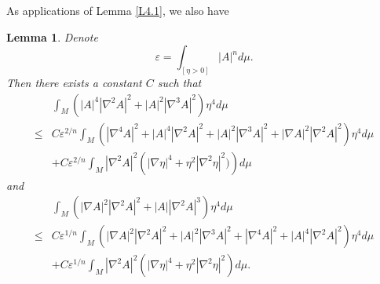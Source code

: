 \documentclass{amsart}
\newtheorem{lemma}[theorem]{Lemma}
\theoremstyle{definition}
\numberwithin{equation}{section}
\begin{document}
As applications of Lemma \ref{L4.1}, we also have
\begin{lemma} \label{L4.4}
Denote
$$\varepsilon = \int_{[\eta >0] } \left| A \right|^{n} d\mu.$$
Then there exists a constant $C$ such that
\begin{align}\label{E1}
   &\int_{M}(  |A|^4 |\nabla^2 A|^2+|A|^2|\nabla^3A|^2  )\eta^4 d\mu\\
    \leq & C \varepsilon^{2/n}\int_{M}  \left (|\nabla^{4}  A|^2+ |A|^4 |\nabla^2 A|^2+ |A|^2|\nabla^3A|^2+ |\nabla A|^2 |\nabla^2
    A|^2\right  )\eta^4d\mu \nonumber\\
     &+  C \varepsilon^{2/n}\int_{M} |\nabla^2 A|^{2}   \left (|\nabla \eta|^4+\eta^2 |\nabla^2\eta|^2 )\right )  d\mu \nonumber
\end{align}
and
\begin{align}\label{2E1}
   &\int_{M}(  |\nabla A|^2 |\nabla^2 A|^2+|A| |\nabla^2A|^3)\eta^4 d\mu\\
    \leq &  C\varepsilon^{1/n}\int_{M} ( |\nabla  A|^2  |\nabla^{2} A |^2+|A|^2|\nabla^{3} A |^2+ |\nabla^4 A|^2+ |A|^4|\nabla^2 A|^2)  \eta^4
    d\mu\nonumber\\
       &+   C\varepsilon^{1/n}\int_{M}    |\nabla^2A|^2 ( |\nabla \eta|^4 + \eta^2|\nabla^2\eta|^2) d\mu.\nonumber
\end{align}
 \end{lemma}
\end{document}

